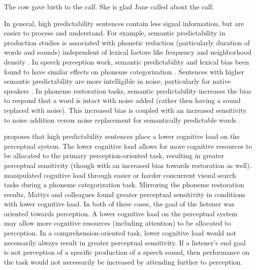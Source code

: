 \ex[exno=1]
The cow gave birth to the calf.
\xe
\ex[exno=2,aboveexskip=0pt]
She is glad Jane called about the calf.
\xe


In general, high predictability sentences contain less signal information, but are easier to process and understand.
For example, semantic predictability in production studies is associated with phonetic reduction (particularly duration of words and sounds) independent of lexical factors like frequency and neighborhood density \citep{Scarborough2010, Clopper2008}.  
In speech perception work, semantic predictability and lexical bias been found to have similar effects on phoneme categorization \citep{Connine1987,Borsky1998}.
Sentences with higher semantic predictability are more intelligible in noise, particularly for native speakers \citep[and others]{Kalikow1977, Mayo1997, Fallon2002, Bradlow2007}.
In phoneme restoration tasks, semantic predictability increases the bias to respond that a word is intact with noise added (rather then having a sound replaced with noise).
This increased bias is coupled with an increased sensitivity to noise addition versus noise replacement for semantically predictable words \citep{Samuel1981}.

\citet{Samuel1981} proposes that high predictability sentences place a lower cognitive load on the perceptual system.  
The lower cognitive load allows for more cognitive resources to be allocated to the primary perception-oriented task, resulting in greater perceptual sensitivity (though with an increased bias towards restoration as well).
\citet{Mattys2011} manipulated cognitive load through easier or harder concurrent visual search tasks during a phoneme categorization task.
Mirroring the phoneme restoration results, Mattys and colleagues found greater perceptual sensitivity in conditions with lower cognitive load.
In both of these cases, the goal of the listener was oriented towards perception.
A lower cognitive load on the perceptual system may allow more cognitive resources (including attention) to be allocated to perception.
In a comprehension-oriented task, lower cognitive load would not necessarily always result in greater perceptual sensitivity. 
If a listener's end goal is not perception of a specific production of a speech sound, then performance on the task would not necessarily be increased by attending further to perception.

